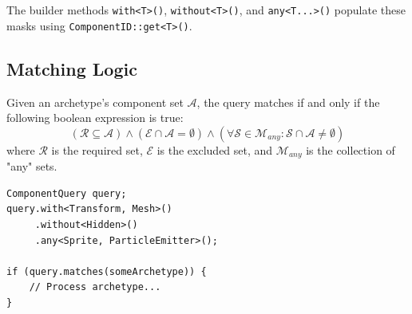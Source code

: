 The builder methods \texttt{with<T>()}, \texttt{without<T>()}, and \texttt{any<T...>()}
populate these masks using \texttt{ComponentID::get<T>()}.

\subsection{Matching Logic}

Given an archetype's component set $\mathcal{A}$, the query matches if and only if the following boolean expression is true:
\begin{equation}
    (\mathcal{R} \subseteq \mathcal{A}) \land (\mathcal{E} \cap \mathcal{A} = \emptyset) \land \left( \forall \mathcal{S} \in \mathcal{M}_{any} : \mathcal{S} \cap \mathcal{A} \neq \emptyset \right)
\end{equation}
where $\mathcal{R}$ is the required set, $\mathcal{E}$ is the excluded set, and $\mathcal{M}_{any}$ is the collection of "any" sets.

\begin{lstlisting}[caption={ComponentQuery API usage}]
ComponentQuery query;
query.with<Transform, Mesh>()
     .without<Hidden>()
     .any<Sprite, ParticleEmitter>();

if (query.matches(someArchetype)) {
    // Process archetype...
}
\end{lstlisting}

